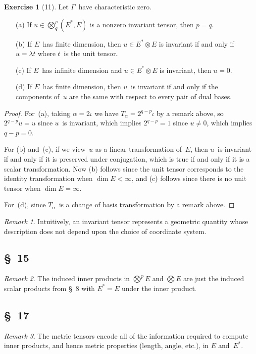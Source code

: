\documentclass[letterpaper,12pt]{article}
\newcommand{\tprod}{\otimes}
\newcommand{\bigtprod}{\bigotimes}
\newcommand{\medtprod}{{\textstyle\bigtprod}}
\theoremstyle{definition}
\newtheorem*{exer}{Exercise}
\theoremstyle{remark}
\newtheorem*{rmk}{Remark}
\begin{document}
\begin{exer}[11]
Let \(\Gamma\)~have characteristic zero.
\begin{enumerate}
\item[(a)] If \(u\in\medtprod^p_q(E^*,E)\) is a nonzero invariant tensor, then \(p=q\).
\item[(b)] If \(E\)~has finite dimension, then \(u\in E^*\tprod E\) is invariant if and only if \(u=\lambda t\) where \(t\)~is the unit tensor.
\item[(c)] If \(E\)~has infinite dimension and \(u\in E^*\tprod E\) is invariant, then \(u=0\).
\item[(d)] If \(E\)~has finite dimension, then \(u\)~is invariant if and only if the components of~\(u\) are the same with respect to every pair of dual bases.
\end{enumerate}
\end{exer}
\begin{proof}
For~(a), taking \(\alpha=2\iota\) we have \(T_{\alpha}=2^{q-p}\iota\) by a remark above, so \(2^{q-p}u=u\) since \(u\)~is invariant, which implies \(2^{q-p}=1\) since \(u\ne 0\), which implies \(q-p=0\).

For (b) and~(c), if we view~\(u\) as a linear transformation of~\(E\), then \(u\)~is invariant if and only if it is preserved under conjugation, which is true if and only if it is a scalar transformation. Now (b) follows since the unit tensor corresponds to the identity transformation when \(\dim E<\infty\), and (c) follows since there is no unit tensor when \(\dim E=\infty\).

For~(d), since \(T_{\alpha}\)~is a change of basis transformation by a remark above.
\end{proof}
\begin{rmk}
Intuitively, an invariant tensor represents a geometric quantity whose description does not depend upon the choice of coordinate system.
\end{rmk}

\subsection*{\S~15}
\begin{rmk}
The induced inner products in \(\medtprod^p E\) and \(\medtprod E\) are just the induced scalar products from \S~8 with \(E^*=E\) under the inner product.
\end{rmk}

\subsection*{\S~17}
\begin{rmk}
The metric tensors encode all of the information required to compute inner products, and hence metric properties (length, angle, etc.), in \(E\) and~\(E^*\).
\end{rmk}
\end{document}
